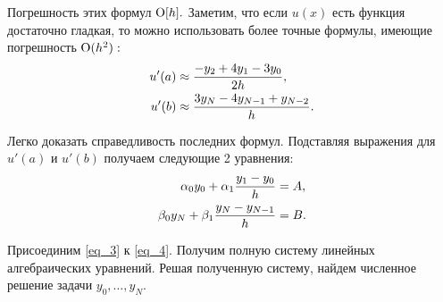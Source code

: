 Погрешность этих формул $\operatorname{O}[h].$ Заметим, что если $u(x)$ есть функция достаточно гладкая, то можно использовать более точные формулы, имеющие погрешность $\operatorname{O}(h^2):$
\begin{equation*}
\begin{split}
u'(a) &\approx \frac{-y_2+4y_1-3y_0}{2h},\\
u'(b) &\approx \frac{3y_N-4y_{N-1}+y_{N-2}}{h}.
\end{split}
\end{equation*}

Легко доказать справедливость последних формул. Подставляя выражения для $u'(a)$ и $u'(b)$ получаем следующие 2 уравнения:
\begin{equation}\label{eq_4}
\begin{split}
\alpha_0y_0+\alpha_1\frac{y_1-y_0}{h} &= A,\\
\beta_0y_N+\beta_1\frac{y_N-y_{N-1}}{h} &= B.
\end{split}
\end{equation}

Присоединим \eqref{eq_3} к \eqref{eq_4}. Получим полную систему линейных алгебраических уравнений. Решая полученную систему, найдем численное решение задачи $y_0, \ldots, y_N.$

